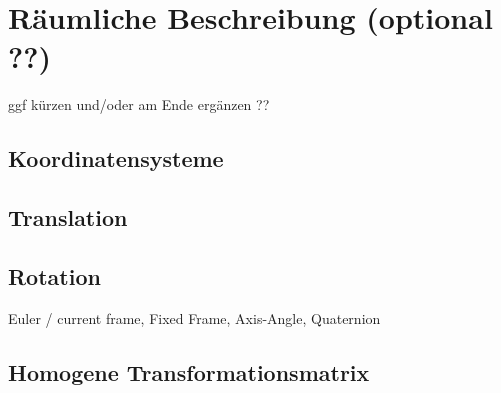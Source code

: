 \cleardoublepage
\chapter{Räumliche Beschreibung (optional ??)}

ggf kürzen und/oder am Ende ergänzen ??

\section{Koordinatensysteme}

\section{Translation}

\section{Rotation}

Euler / current frame,
Fixed Frame,
Axis-Angle,
Quaternion

\section{Homogene Transformationsmatrix}\label{sec:homogene-transformationsmatrix}